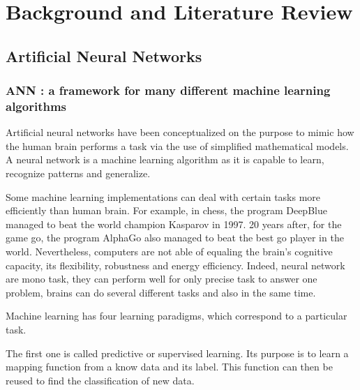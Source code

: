
\chapter{Background and Literature Review} %

\label{Chapter2} %




\section{Artificial Neural Networks}
\subsection{ANN : a framework for many different machine learning algorithms}

Artificial neural networks have been conceptualized on the purpose to mimic how the human brain performs a task via the use of simplified mathematical models. A neural network is a machine learning algorithm as it is capable to learn, recognize patterns and generalize. 

Some machine learning implementations can deal with certain tasks more efficiently than human brain. For example, in chess, the program DeepBlue managed to beat the world champion Kasparov in 1997. 20 years after, for the game go, the program AlphaGo also managed to beat the best go player in the world. Nevertheless, computers are not able of equaling the brain's cognitive capacity, its flexibility, robustness and energy efficiency. Indeed, neural network are mono task, they can perform well for only precise task to answer one problem, brains can do several different tasks and also in the same time.

Machine learning has four learning paradigms, which correspond to a particular task.

The first one is called predictive or supervised learning. Its purpose is to learn a mapping function from a know data and its label. This function can then be reused to find the classification of new data. 

